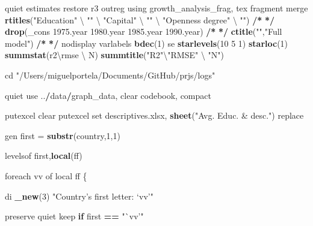 \documentclass[
  12pt,
]{article}
\newenvironment{Shaded}{\begin{snugshade}}{\end{snugshade}}
\newcommand{\ControlFlowTok}[1]{\textcolor[rgb]{0.13,0.29,0.53}{\textbf{#1}}}
\newcommand{\DecValTok}[1]{\textcolor[rgb]{0.00,0.00,0.81}{#1}}
\newcommand{\ErrorTok}[1]{\textcolor[rgb]{0.64,0.00,0.00}{\textbf{#1}}}
\newcommand{\FloatTok}[1]{\textcolor[rgb]{0.00,0.00,0.81}{#1}}
\newcommand{\KeywordTok}[1]{\textcolor[rgb]{0.13,0.29,0.53}{\textbf{#1}}}
\newcommand{\NormalTok}[1]{#1}
\newcommand{\OperatorTok}[1]{\textcolor[rgb]{0.81,0.36,0.00}{\textbf{#1}}}
\newcommand{\StringTok}[1]{\textcolor[rgb]{0.31,0.60,0.02}{#1}}
\begin{document}
\begin{Shaded}
\begin{Highlighting}[]
\NormalTok{    quiet estimates restore r3}
\NormalTok{        outreg using growth_analysis_frag, tex fragment merge }\KeywordTok{rtitles}\NormalTok{(}\StringTok{"Education"}\NormalTok{ \textbackslash{} }\StringTok{""}\NormalTok{ \textbackslash{} }\StringTok{"Capital"}\NormalTok{ \textbackslash{} }\StringTok{""}\NormalTok{ \textbackslash{} }\StringTok{"Openness degree"}\NormalTok{ \textbackslash{} }\StringTok{""}\NormalTok{)  }\OperatorTok{/}\ErrorTok{*}
\StringTok{                }\ErrorTok{*/}\StringTok{ }\KeywordTok{drop}\NormalTok{(_cons }\FloatTok{1975.}\NormalTok{year }\FloatTok{1980.}\NormalTok{year }\FloatTok{1985.}\NormalTok{year }\FloatTok{1990.}\NormalTok{year) }\OperatorTok{/}\ErrorTok{*}
\StringTok{                }\ErrorTok{*/}\StringTok{ }\KeywordTok{ctitle}\NormalTok{(}\StringTok{""}\NormalTok{,}\StringTok{"Full model"}\NormalTok{) }\OperatorTok{/}\ErrorTok{*}
\StringTok{                }\ErrorTok{*/}\StringTok{ }\NormalTok{nodisplay varlabels }\KeywordTok{bdec}\NormalTok{(}\DecValTok{1}\NormalTok{) se }\KeywordTok{starlevels}\NormalTok{(}\DecValTok{10} \DecValTok{5} \DecValTok{1}\NormalTok{) }\KeywordTok{starloc}\NormalTok{(}\DecValTok{1}\NormalTok{) }\KeywordTok{summstat}\NormalTok{(r2\textbackslash{}rmse \textbackslash{} N) }\KeywordTok{summtitle}\NormalTok{(}\StringTok{"R2"}\NormalTok{\textbackslash{}}\StringTok{"RMSE"}\NormalTok{ \textbackslash{} }\StringTok{"N"}\NormalTok{)}



\NormalTok{cd }\StringTok{"/Users/miguelportela/Documents/GitHub/prjs/logs"}

\NormalTok{quiet use ..}\OperatorTok{/}\NormalTok{data}\OperatorTok{/}\NormalTok{graph_data, clear}
\NormalTok{    codebook, compact}

\NormalTok{            putexcel clear}
\NormalTok{            putexcel set descriptives.xlsx, }\KeywordTok{sheet}\NormalTok{(}\StringTok{"Avg. Educ. & desc."}\NormalTok{) replace}
            

\NormalTok{gen first =}\StringTok{ }\KeywordTok{substr}\NormalTok{(country,}\DecValTok{1}\NormalTok{,}\DecValTok{1}\NormalTok{)}

\NormalTok{    levelsof first,}\KeywordTok{local}\NormalTok{(ff)}
    
\NormalTok{    foreach vv of local ff \{}
    
\NormalTok{        di }\KeywordTok{_new}\NormalTok{(}\DecValTok{3}\NormalTok{) }\StringTok{"Country's first letter: `vv'"}
        
\NormalTok{        preserve}
\NormalTok{        quiet keep }\ControlFlowTok{if}\NormalTok{ first }\OperatorTok{==}\StringTok{ "`vv'"}
        

\end{Highlighting}
\end{Shaded}
\end{document}
